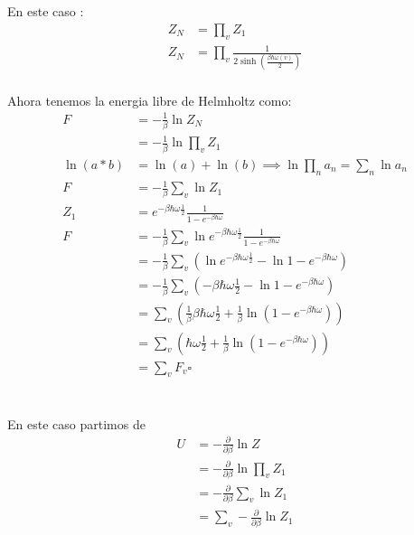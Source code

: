 \documentclass{report}
\begin{document}
\section{}

En este caso :
\begin{align*}
		Z_N &= \prod_v Z_1\\
		Z_N &= \prod_{v} \frac{1}{2\sinh \left( \frac{\beta \hbar \omega(v)}{2} \right)}\\
\end{align*}

Ahora tenemos la energia libre de Helmholtz como:
\begin{align*}
	F &= - \frac{1}{\beta} \ln Z_N\\
	&= - \frac{1}{\beta} \ln \prod_v Z_1\\
	\ln \left( a * b \right) &= \ln(a) + \ln(b) \implies \ln \prod_n a_n = \sum_n \ln a_n\\
	F &= - \frac{1}{\beta} \sum_{v} \ln Z_1\\
	Z_1 &= e^{-\beta \hbar \omega \frac{1}{2}} \frac{1}{1 - e^{-\beta\hbar\omega}}\\
	F &= - \frac{1}{\beta} \sum_{v} \ln e^{-\beta \hbar \omega \frac{1}{2}} \frac{1}{1 - e^{-\beta\hbar\omega}} \\
	&= - \frac{1}{\beta} \sum_{v} \left(\ln e^{-\beta \hbar \omega \frac{1}{2}} - \ln 1 - e^{-\beta\hbar\omega}\right) \\
	&= - \frac{1}{\beta} \sum_{v} \left( -\beta \hbar \omega \frac{1}{2} - \ln 1 - e^{-\beta\hbar\omega}\right) \\
	&= \sum_{v} \left(\frac{1}{\beta}\beta \hbar \omega \frac{1}{2} + \frac{1}{\beta}\ln \left(1 - e^{-\beta\hbar\omega}\right)\right) \\
	&= \sum_{v} \left( \hbar \omega \frac{1}{2} + \frac{1}{\beta}\ln \left(1 - e^{-\beta\hbar\omega}\right)\right) \\
	&= \sum_{v} F_v\square
\end{align*}

\section{}

En este caso partimos de
\begin{align*}
	U &= - \frac{\partial}{\partial \beta} \ln Z\\
	&= - \frac{\partial}{\partial \beta} \ln \prod_v Z_1\\
	&= - \frac{\partial}{\partial \beta} \sum_v \ln Z_1\\
	&=\sum_v - \frac{\partial}{\partial \beta} \ln Z_1\\
\end{align*}
\end{document}
